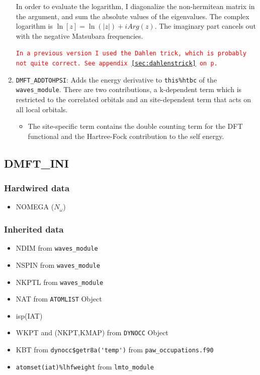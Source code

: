 \documentclass[11pt,a4paper]{report}
\newcommand{\petertt}[1]{\textcolor{red}{\texttt{#1}}}
\begin{document}
\begin{enumerate}
In order to evaluate the logarithm, I diagonalize the non-hermitean
matrix in the argument, and sum the absolute values of the
eigenvalues. The complex logarithm is $\ln[z]=\ln(|z|)+i Arg(z)$. The
imaginary part cancels out with the negative Matsubara frequencies.

\petertt{In a previous version I used the Dahlen trick, which is
  probably not quite correct. See appendix~\ref{sec:dahlenstrick} on
  p.~\pageref{sec:dahlenstrick} }
%
\item \verb|DMFT_ADDTOHPSI|: Adds the energy derivative to
  \verb|this%htbc| of the \verb|waves_module|. There are two
  contributions, a k-dependent term which is restricted to the
  correlated orbitals and an site-dependent term that acts on all
  local orbitals.
\begin{itemize}
\item The site-specific term contains the double counting term for the
  DFT functional and the Hartree-Fock contribution to the self energy.
\end{itemize}
\end{enumerate}



\subsection{DMFT\_INI}

\subsubsection{Hardwired data}
\begin{itemize}
\item NOMEGA ($N_\omega$)
\end{itemize}

\subsubsection{Inherited data}
\begin{itemize}
\item NDIM from \verb|waves_module|
\item NSPIN from \verb|waves_module|
\item NKPTL from \verb|waves_module|
\item NAT  from \verb|ATOMLIST| Object
\item isp(IAT)
\item WKPT and (NKPT,KMAP) from \verb|DYNOCC| Object
\item KBT from \verb|dynocc$getr8a('temp')| from
  \verb|paw_occupations.f90|
\item \verb|atomset(iat)%lhfweight| from \verb|lmto_module|
\end{itemize}
\end{document}

